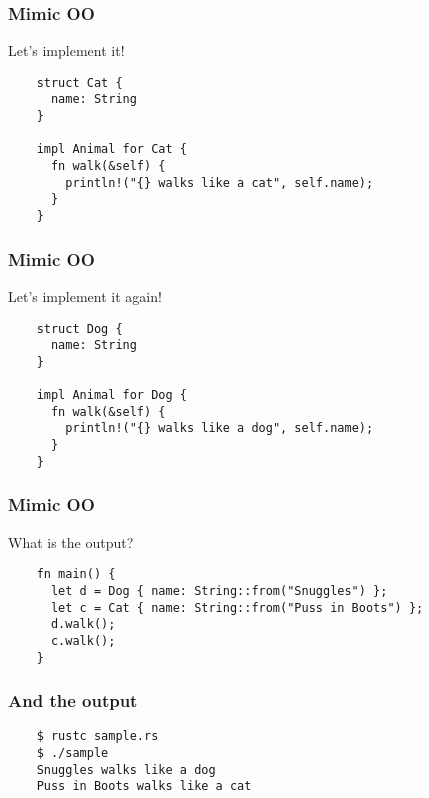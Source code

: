 \begin{frame}[fragile]
  \frametitle{Mimic OO}
  Let's implement it! \break{}
  \begin{verbatim}
    struct Cat {
      name: String
    }

    impl Animal for Cat {
      fn walk(&self) {
        println!("{} walks like a cat", self.name);
      }
    }
  \end{verbatim}
\end{frame}

\begin{frame}[fragile]
  \frametitle{Mimic OO}
  Let's implement it again! \break{}
  \begin{verbatim}
    struct Dog {
      name: String
    }

    impl Animal for Dog {
      fn walk(&self) {
        println!("{} walks like a dog", self.name);
      }
    }
  \end{verbatim}
\end{frame}

\begin{frame}[fragile]
  \frametitle{Mimic OO}
  What is the output? \break{}
  \begin{verbatim}
    fn main() {
      let d = Dog { name: String::from("Snuggles") };
      let c = Cat { name: String::from("Puss in Boots") };
      d.walk();
      c.walk();
    }
  \end{verbatim}
\end{frame}

\begin{frame}[fragile]
  \frametitle{And the output}
  \begin{verbatim}
    $ rustc sample.rs
    $ ./sample
    Snuggles walks like a dog
    Puss in Boots walks like a cat
  \end{verbatim}
\end{frame}


